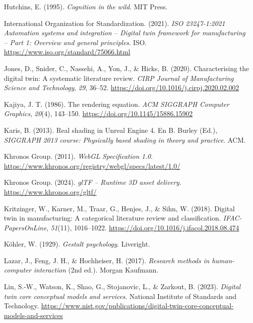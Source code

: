 \begin{list}{}
\item Hutchins, E. (1995). \textit{Cognition in the wild}. MIT Press.

\item International Organization for Standardization. (2021). \textit{ISO 23247-1:2021 Automation systems and integration -- Digital twin framework for manufacturing -- Part 1: Overview and general principles}. ISO. \url{https://www.iso.org/standard/75066.html}

\item Jones, D., Snider, C., Nassehi, A., Yon, J., \& Hicks, B. (2020). Characterising the digital twin: A systematic literature review. \textit{CIRP Journal of Manufacturing Science and Technology}, \textit{29}, 36--52. \url{https://doi.org/10.1016/j.cirpj.2020.02.002}

\item Kajiya, J. T. (1986). The rendering equation. \textit{ACM SIGGRAPH Computer Graphics}, \textit{20}(4), 143--150. \url{https://doi.org/10.1145/15886.15902}

\item Karis, B. (2013). Real shading in Unreal Engine 4. En B. Burley (Ed.), \textit{SIGGRAPH 2013 course: Physically based shading in theory and practice}. ACM.

\item Khronos Group. (2011). \textit{WebGL Specification 1.0}. \url{https://www.khronos.org/registry/webgl/specs/latest/1.0/}

\item Khronos Group. (2024). \textit{glTF -- Runtime 3D asset delivery}. \url{https://www.khronos.org/gltf/}

\item Kritzinger, W., Karner, M., Traar, G., Henjes, J., \& Sihn, W. (2018). Digital twin in manufacturing: A categorical literature review and classification. \textit{IFAC-PapersOnLine}, \textit{51}(11), 1016--1022. \url{https://doi.org/10.1016/j.ifacol.2018.08.474}

\item Köhler, W. (1929). \textit{Gestalt psychology}. Liveright.

\item Lazar, J., Feng, J. H., \& Hochheiser, H. (2017). \textit{Research methods in human-computer interaction} (2nd ed.). Morgan Kaufmann.

\item Lin, S.-W., Watson, K., Shao, G., Stojanovic, L., \& Zarkout, B. (2023). \textit{Digital twin core conceptual models and services}. National Institute of Standards and Technology. \url{https://www.nist.gov/publications/digital-twin-core-conceptual-models-and-services}


\end{list}
